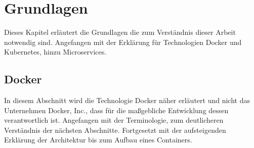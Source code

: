 \chapter{Grundlagen}
Dieses Kapitel erläutert die Grundlagen die zum 
Verständnis dieser Arbeit notwendig sind. 
Angefangen mit der Erklärung für Technologien
Docker und Kubernetes, hinzu Microservices.


\section{Docker} \label{Docker}

In diesem Abschnitt wird die Technologie \glqq Docker\grqq{} näher erläutert und
nicht das Unternehmen \glqq Docker, Inc.\grqq{}, dass für die maßgebliche Entwicklung dessen verantwortlich ist.
Angefangen mit der Terminologie, zum deutlicheren Verständnis der nächsten Abschnitte.
Fortgesetzt mit der aufsteigenden Erklärung der Architektur bis zum Aufbau eines Containers.


